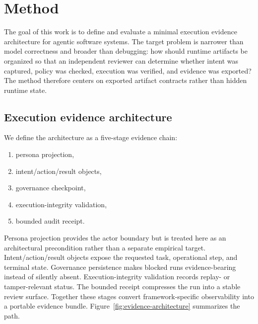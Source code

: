 \section{Method}
\label{sec:method}

The goal of this work is to define and evaluate a minimal execution evidence architecture for agentic software systems. The target problem is narrower than model correctness and broader than debugging: how should runtime artifacts be organized so that an independent reviewer can determine whether intent was captured, policy was checked, execution was verified, and evidence was exported? The method therefore centers on exported artifact contracts rather than hidden runtime state.

\subsection{Execution evidence architecture}

We define the architecture as a five-stage evidence chain:

\begin{enumerate}[leftmargin=1.8em]
  \item persona projection,
  \item intent/action/result objects,
  \item governance checkpoint,
  \item execution-integrity validation,
  \item bounded audit receipt.
\end{enumerate}

Persona projection provides the actor boundary but is treated here as an architectural precondition rather than a separate empirical target. Intent/action/result objects expose the requested task, operational step, and terminal state. Governance persistence makes blocked runs evidence-bearing instead of silently absent. Execution-integrity validation records replay- or tamper-relevant status. The bounded receipt compresses the run into a stable review surface. Together these stages convert framework-specific observability into a portable evidence bundle. Figure~\ref{fig:evidence-architecture} summarizes the path.

